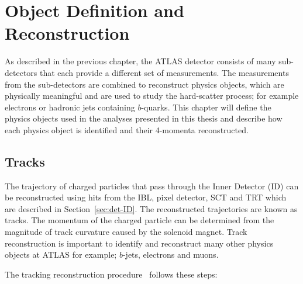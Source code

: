 \chapter{Object Definition and Reconstruction}
\label{sec:obj}

As described in the previous chapter,
the ATLAS detector consists of many sub-detectors
that each provide a different set of measurements.
The measurements from the sub-detectors are combined to reconstruct physics objects,
which are physically meaningful and are used to study the hard-scatter process;
for example electrons or hadronic jets containing $b$-quarks.
This chapter will define the physics objects used in the analyses presented in this thesis
and describe how each physics object is identified and their 4-momenta reconstructed.

\section{Tracks}
\label{sec:obj-tracks}

The trajectory of charged particles that pass through the Inner Detector (ID) can be reconstructed
using hits from the IBL, pixel detector, SCT and TRT which are described in Section~\ref{sec:det-ID}.
The reconstructed trajectories are known as tracks.
The momentum of the charged particle can be determined from the magnitude of track curvature caused by the solenoid magnet.
Track reconstruction is important to identify and reconstruct many other physics objects at ATLAS
for example; $b$-jets, electrons and muons.

\noindent
The tracking reconstruction procedure~\cite{obj-tracks_TIDE} follows these steps:

